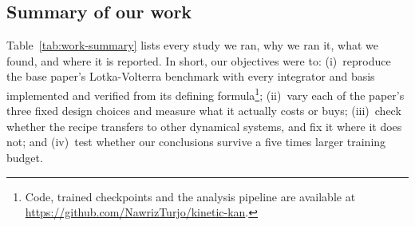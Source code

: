 \subsection{Summary of our work}
\label{sec:work-summary}

Table~\ref{tab:work-summary} lists every study we ran, why we ran it, what we
found, and where it is reported. In short, our objectives were to:
(i)~reproduce the base paper's Lotka-Volterra benchmark with every
integrator and basis implemented and verified from its defining
formula\footnote{Code, trained checkpoints and the analysis pipeline are
available at \url{https://github.com/NawrizTurjo/kinetic-kan}.};
(ii)~vary each of the paper's three fixed design choices and measure what
it actually costs or buys; (iii)~check whether the recipe transfers to other
dynamical systems, and fix it where it does not; and (iv)~test whether our
conclusions survive a five times larger training budget.

